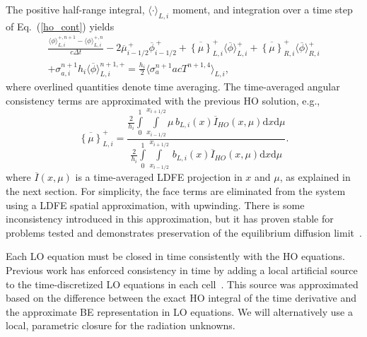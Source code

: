 \documentclass{anstrans}
\renewcommand{\eqref}[1]{(\ref{#1})}
\renewcommand{\d}{\mathrm{d}}
\newcommand{\mom}[1]{\langle #1 \rangle}
\newcommand{\xl}{{x_{i-1/2}}}
\newcommand{\xr}{{x_{i+1/2}}}
\newcommand{\phibar}{\ensuremath{\overline{\phi}}}
\newcommand{\cur}[1]{\left\{ #1 \right\}}
\begin{document}
The positive half-range integral, $\mom{\cdot}_{L,i}$ moment, and
integration over a time step of Eq.~\eqref{ho_cont} yields
\begin{multline}\label{eq:t_moml_ex}
    \frac{\mom{\phi}_{L,i}^{+,n+1} - \mom{\phi}_{L,i}^{+,n}}{c \Delta t}
    -2\overline {\mu}_{i-1/2}^{\,+} \overline \phi_{i-1/2}^{\,+} + \overline{\cur {\mu}}_{L,i}^{+}
  \mom{\phibar}_{L,i}^{+}
  +  \overline{\cur\mu}_{R,i}^{+}
  \mom{\phibar}_{R,i}^{+} \\ +  \sigma_{a,i}^{n+1} h_i 
  \mom{\overline\phi}_{L,i}^{n+1,+}   = \frac{h_i}{2} \mom{\sigma_a^{n+1} a c T^{n+1,4}}_{L,i},
\end{multline}
where overlined quantities denote time averaging.  The time-averaged angular consistency
terms are approximated with the previous HO solution, e.g.,
\begin{equation}\label{const}
    \overline{\cur{{\mu}}}_{L,i}^+ =  \frac{
        {\displaystyle \frac{2}{h_i}} \int\limits_0^1 \int\limits_\xl^\xr \mu \, b_{L,i}(x)
        \overline{I}_{HO}(x,\mu) \d x \d \mu } 
{{\displaystyle \frac{2}{h_i}} \int\limits_0^1 \int\limits_\xl^\xr \, b_{L,i}(x)
\overline{I}_{HO}(x,\mu) \d x \d \mu } .
\end{equation}
where $\overline{I}(x,\mu)$ is a time-averaged LDFE projection in $x$ and $\mu$, as
explained in the next section.  For simplicity, the face terms are eliminated from the system using a LDFE
spatial approximation, with upwinding.  There is some inconsistency introduced in this approximation, but
it has proven stable for problems tested and demonstrates preservation of the equilibrium diffusion
limit~\cite{morel_ldtrt}.

Each LO equation must be closed in time consistently with the HO
equations.   Previous work has enforced
consistency in time by adding a local artificial source to the time-discretized LO
equations in each cell~\cite{holo_rh}.  This
source was approximated based on the difference between the exact HO integral of the time
derivative and the approximate BE representation in LO equations. We will alternatively use a
local, parametric closure for the radiation unknowns. 
\end{document}
